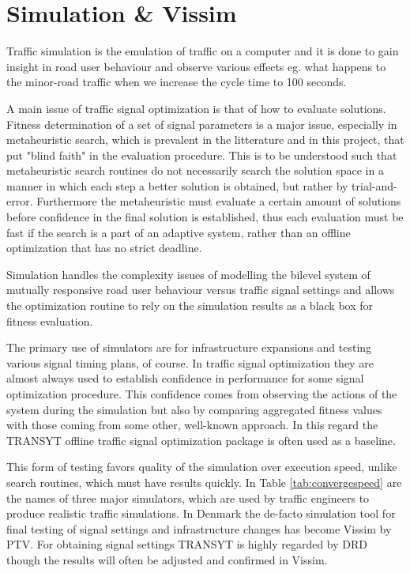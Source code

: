 \section{Simulation \& Vissim}
\label{simulation}
Traffic simulation is the emulation of traffic on a computer and it is done to gain insight in road user behaviour and observe various effects eg. what happens to the minor-road traffic when we increase the cycle time to 100 seconds.

A main issue of traffic signal optimization is that of how to evaluate solutions. Fitness determination of a set of signal parameters is a major issue, especially in metaheuristic search, which is prevalent in the litterature and in this project, that put "blind faith" in the evaluation procedure. This is to be understood such that metaheuristic search routines do not necessarily search the solution space in a manner in which each step a better solution is obtained, but rather by trial-and-error. 
Furthermore the metaheuristic must evaluate a certain amount of solutions before confidence in the final solution is established, thus each evaluation must be fast if the search is a part of an adaptive system, rather than an offline optimization that has no strict deadline.

Simulation handles the complexity issues of modelling the bilevel system of mutually responsive road user behaviour versus traffic signal settings and allows the optimization routine to rely on the simulation results as a black box for fitness evaluation. 

The primary use of simulators are for infrastructure expansions and testing various signal timing plans, of course. In traffic signal optimization they are almost always used to establish confidence in performance for some signal optimization procedure. This confidence comes from observing the actions of the system during the simulation but also by comparing aggregated fitness values with those coming from some other, well-known approach. In this regard the TRANSYT offline traffic signal optimization package is often used as a baseline. 

This form of testing favors quality of the simulation over execution speed, unlike search routines, which must have results quickly. 
In Table \ref{tab:convergespeed} are the names of three major simulators, which are used by traffic engineers to produce realistic traffic simulations. 
In Denmark the de-facto simulation tool for final testing of signal settings and infrastructure changes has become Vissim by PTV. For obtaining signal settings TRANSYT is highly regarded by DRD though the results will often be adjusted and confirmed in Vissim.

